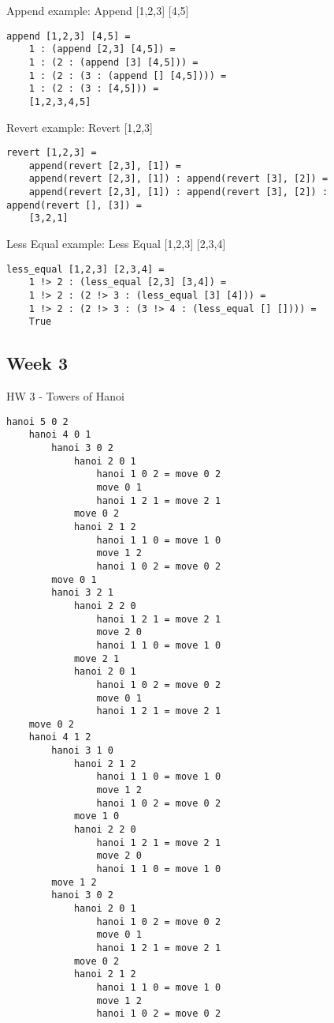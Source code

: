 \documentclass{article}
\theoremstyle{theorem}
\theoremstyle{definition}
\theoremstyle{remark}
\begin{document}
\noindent
Append example: 
\newline\newline\indent
Append [1,2,3] [4,5]
\begin{lstlisting}
append [1,2,3] [4,5] = 
    1 : (append [2,3] [4,5]) = 
    1 : (2 : (append [3] [4,5])) = 
    1 : (2 : (3 : (append [] [4,5]))) = 
    1 : (2 : (3 : [4,5])) = 
    [1,2,3,4,5]
\end{lstlisting}
%

\noindent
Revert example: 
\newline\newline\indent
Revert [1,2,3]
\begin{lstlisting}
revert [1,2,3] = 
    append(revert [2,3], [1]) =
    append(revert [2,3], [1]) : append(revert [3], [2]) =
    append(revert [2,3], [1]) : append(revert [3], [2]) : append(revert [], [3]) =
    [3,2,1]
\end{lstlisting}
%

\noindent
Less Equal example: 
\newline\newline\indent
Less Equal [1,2,3] [2,3,4]
\begin{lstlisting}
less_equal [1,2,3] [2,3,4] = 
    1 !> 2 : (less_equal [2,3] [3,4]) =
    1 !> 2 : (2 !> 3 : (less_equal [3] [4])) =
    1 !> 2 : (2 !> 3 : (3 !> 4 : (less_equal [] []))) =
    True
\end{lstlisting}
%

\subsection{Week 3}

HW 3 - Towers of Hanoi

\begin{lstlisting}
hanoi 5 0 2  
	hanoi 4 0 1 
		hanoi 3 0 2
			hanoi 2 0 1 
				hanoi 1 0 2 = move 0 2 
				move 0 1
				hanoi 1 2 1 = move 2 1 
			move 0 2  
			hanoi 2 1 2  
				hanoi 1 1 0 = move 1 0  
				move 1 2  
				hanoi 1 0 2 = move 0 2 
        move 0 1
        hanoi 3 2 1
            hanoi 2 2 0
                hanoi 1 2 1 = move 2 1
                move 2 0
                hanoi 1 1 0 = move 1 0
            move 2 1
            hanoi 2 0 1
                hanoi 1 0 2 = move 0 2
                move 0 1
                hanoi 1 2 1 = move 2 1
    move 0 2
    hanoi 4 1 2
        hanoi 3 1 0
            hanoi 2 1 2
                hanoi 1 1 0 = move 1 0
                move 1 2
                hanoi 1 0 2 = move 0 2
            move 1 0
            hanoi 2 2 0
                hanoi 1 2 1 = move 2 1
                move 2 0
                hanoi 1 1 0 = move 1 0
        move 1 2
        hanoi 3 0 2
            hanoi 2 0 1
                hanoi 1 0 2 = move 0 2
                move 0 1
                hanoi 1 2 1 = move 2 1
            move 0 2
            hanoi 2 1 2
                hanoi 1 1 0 = move 1 0
                move 1 2
                hanoi 1 0 2 = move 0 2
\end{lstlisting}
%
\end{document}
